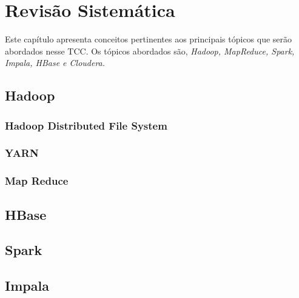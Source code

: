 \chapter[Revisão Sistemática]{Revisão Sistemática}

    Este capítulo apresenta conceitos pertinentes aos principais tópicos que serão abordados
    nesse TCC. Os tópicos abordados são, \textit{Hadoop, MapReduce, Spark, Impala, HBase e
    Cloudera.}

    \section{Hadoop}

        \subsection{Hadoop Distributed File System}

        \subsection{YARN}

        \subsection{Map Reduce}

    \section{HBase}

    \section{Spark}

    \section{Impala}




